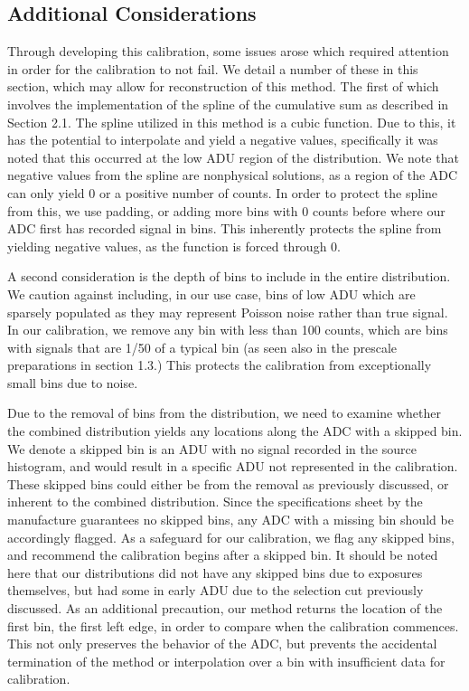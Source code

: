 \documentclass[11pt, letterpaper]{article}
\begin{document}
\subsection{Additional Considerations} 
\indent 


Through developing this calibration, some issues arose which required attention in order for the calibration to not fail. 
We detail a number of these in this section, which may allow for reconstruction of this method. 
\indent 
The first of which involves the implementation of the spline of the cumulative sum as described in Section 2.1. 
The spline utilized in this method is a cubic function. 
Due to this, it has the potential to interpolate and yield a negative values, specifically it was noted that this occurred at the low ADU region of the distribution. 
We note that negative values from the spline are nonphysical solutions, as a region of the ADC can only yield 0 or a positive number of counts. 
In order to protect the spline from this, we use padding, or adding more bins with 0 counts before where our ADC first has recorded signal in bins. 
This inherently protects the spline from yielding negative values, as the function is forced through 0. 
\indent 

A second consideration is the depth of bins to include in the entire distribution. 
We caution against including, in our use case, bins of low ADU which are sparsely populated as they may represent Poisson noise rather than true signal. 
In our calibration, we remove any bin with less than 100 counts, which are bins with signals that are 1/50 of a typical bin (as seen also in the prescale preparations in section 1.3.) 
This protects the calibration from exceptionally small bins due to noise.
\indent

Due to the removal of bins from the distribution, we need to examine whether the combined distribution yields any locations along the ADC with a skipped bin. 
We denote a skipped bin is an ADU with no signal recorded in the source histogram, and would result in a specific ADU not represented in the calibration. 
These skipped bins could either be from the removal as previously discussed, or inherent to the combined distribution. 
Since the specifications sheet by the manufacture guarantees no skipped bins, any ADC with a missing bin should be accordingly flagged. 
As a safeguard for our calibration, we flag any skipped bins, and recommend the calibration begins after a skipped bin. 
It should be noted here that our distributions did not have any skipped bins due to exposures themselves, but had some in early ADU due to the selection cut previously discussed. 
As an additional precaution, our method returns the location of the first bin, the first left edge, in order to compare when the calibration commences. 
This not only preserves the behavior of the ADC, but prevents the accidental termination of the method or interpolation over a bin with insufficient data for calibration. 
\indent 
\end{document}
